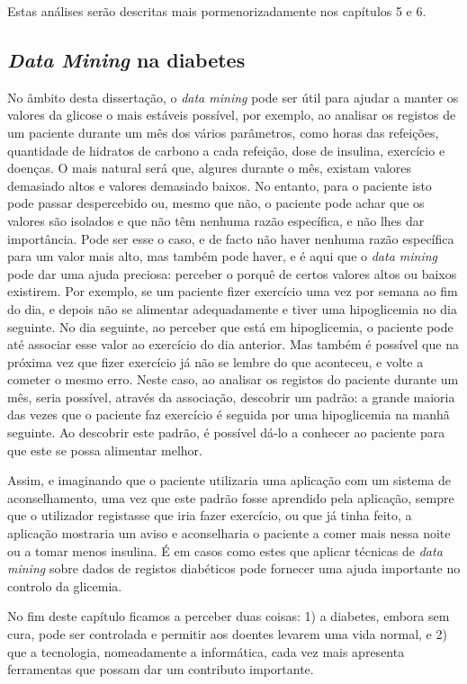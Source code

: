 Estas análises serão descritas mais pormenorizadamente nos capítulos 5 e 6.

\subsection{\textit{Data Mining} na diabetes}

No âmbito desta dissertação, o \textit{data mining} pode ser útil para ajudar a manter os valores da glicose o mais estáveis possível, por exemplo, ao analisar os registos de um paciente durante um mês dos vários parâmetros, como horas das refeições, quantidade de hidratos de carbono a cada refeição, dose de insulina, exercício e doenças. O mais natural será que, algures durante o mês, existam valores demasiado altos e valores demasiado baixos. 
No entanto, para o paciente isto pode passar despercebido ou, mesmo que não, o paciente pode achar que os valores são isolados e que não têm nenhuma razão específica, e não lhes dar importância. Pode ser esse o caso, e de facto não haver nenhuma razão específica para um valor mais alto, mas também pode haver, e é aqui que o \textit{data mining} pode dar uma ajuda preciosa:  perceber o porquê de certos valores altos ou baixos existirem. Por exemplo, se um paciente fizer exercício uma vez por semana ao fim do dia, e depois não se alimentar adequadamente e tiver uma hipoglicemia no dia seguinte. No dia seguinte, ao perceber que está em hipoglicemia, o paciente pode até associar esse valor ao exercício do dia anterior. Mas também é possível que na próxima vez que fizer exercício já não se lembre do que aconteceu, e volte a cometer o mesmo erro. 
Neste caso, ao analisar os registos do paciente durante um mês, seria possível, através da associação, descobrir um padrão: a grande maioria das vezes que o paciente faz exercício é seguida por uma hipoglicemia na manhã seguinte. Ao descobrir este padrão, é possível dá-lo a conhecer ao paciente para que este se possa alimentar melhor.

Assim, e imaginando que o paciente utilizaria uma aplicação com um sistema de aconselhamento, uma vez que este padrão fosse aprendido pela aplicação, sempre que o utilizador registasse que iria fazer exercício, ou que já tinha feito, a aplicação mostraria um aviso e aconselharia o paciente a comer mais nessa noite ou a tomar menos insulina. É em casos como estes que aplicar técnicas de \textit{data mining} sobre dados de registos diabéticos pode fornecer uma ajuda importante no controlo da glicemia.\newline

No fim deste capítulo ficamos a perceber duas coisas: 1) a diabetes, embora sem cura, pode ser controlada e permitir aos doentes levarem uma vida normal, e 2) que a tecnologia, nomeadamente a informática, cada vez mais apresenta ferramentas que possam dar um contributo importante. 

